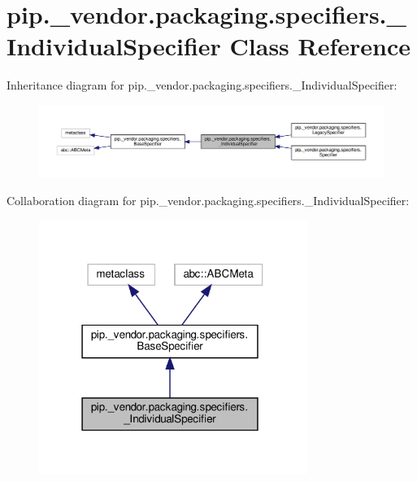 \hypertarget{classpip_1_1__vendor_1_1packaging_1_1specifiers_1_1__IndividualSpecifier}{}\section{pip.\+\_\+vendor.\+packaging.\+specifiers.\+\_\+\+Individual\+Specifier Class Reference}
\label{classpip_1_1__vendor_1_1packaging_1_1specifiers_1_1__IndividualSpecifier}


Inheritance diagram for pip.\+\_\+vendor.\+packaging.\+specifiers.\+\_\+\+Individual\+Specifier\+:
\nopagebreak
\begin{figure}[H]
\begin{center}
\leavevmode
\includegraphics[width=350pt]{classpip_1_1__vendor_1_1packaging_1_1specifiers_1_1__IndividualSpecifier__inherit__graph}
\end{center}
\end{figure}


Collaboration diagram for pip.\+\_\+vendor.\+packaging.\+specifiers.\+\_\+\+Individual\+Specifier\+:
\nopagebreak
\begin{figure}[H]
\begin{center}
\leavevmode
\includegraphics[width=247pt]{classpip_1_1__vendor_1_1packaging_1_1specifiers_1_1__IndividualSpecifier__coll__graph}
\end{center}
\end{figure}
